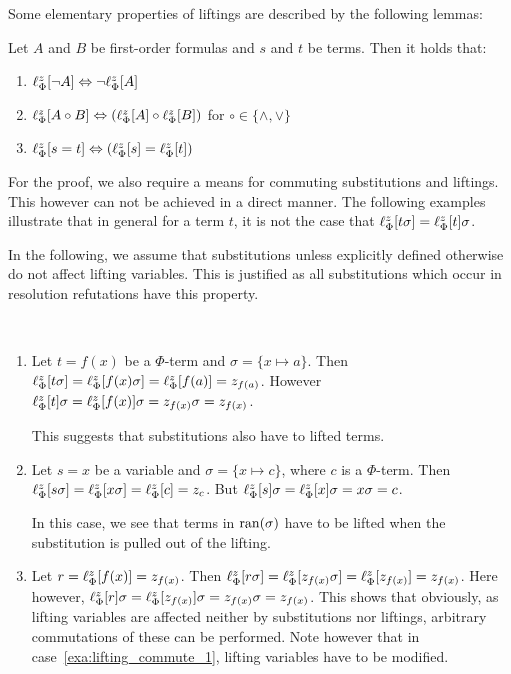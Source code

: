 Some elementary properties of liftings are described by the following lemmas:


\begin{lemma}
	\label{lemma:lift_logic_commute}
	Let $A$ and $B$ be first-order formulas and $s$ and $t$ be terms. Then it holds that:
	\begin{enumerate}
		\item $\lift{\Phi}{\lnot A}{z} \spas\semiff{} \lnot \lift{\Phi}{A}{z}$
		\item $\lift{\Phi}{A \circ B}{z} \spas\semiff{} ( \lift{\Phi}{A}{z} \circ \lift{\Phi}{B}{z} )$ for  $\circ \in \{\land, \lor\}$
		\item $\lift{\Phi}{s = t}{z} \spas\semiff{} ( \lift{\Phi}{s}{z} = \lift{\Phi}{t}{z} )$
	\end{enumerate}
\end{lemma}


For the proof, we also require a means for commuting substitutions and liftings.
This however can not be achieved in a direct manner. The following examples illustrate
that in general for a term $t$, it is not the case that
$
\lifphi{t\sigma} =
\lifphi{t}\sigma 
$.

In the following, we assume that substitutions unless explicitly defined otherwise do not affect lifting variables.
This is justified as all substitutions which occur in resolution refutations have this property.

\begin{exa}
	\label{exa:lifting_commute}
	~
	\begin{enumerate}
		\item
			\label{exa:lifting_commute_1}
			Let $t = f(x)$ be a $\Phi$-term and $\sigma = \{x \mapsto a\}$.
			Then $\lifphi{t\sigma} = \lifphi{f(x)\sigma} = \lifphi{f(a)} = z_{f(a)}$.
			However $\lifphi{t}\sigma = \lifphi{f(x)}\sigma = z_{f(x)}\sigma = z_{f(x)}$.

			This suggests that substitutions also have to lifted terms.

		\item
			\label{exa:lifting_commute_2}
			Let $s=x$ be a variable and $\sigma = \{x\mapsto c\}$, where $c$ is a $\Phi$-term.
			Then $\lifphi{s\sigma} = 
			\lifphi{x\sigma} =
			\lifphi{c} = z_c$.
			But 
			$\lifphi{s}\sigma = 
			\lifphi{x}\sigma = 
			x\sigma = 
			c$.

			In this case, we see that terms in $\ran(\sigma)$ have to be lifted when the substitution is pulled out of the lifting.

		\item
			\label{exa:lifting_commute_3}
			Let $r = \lifphi{f(x)} = z_{f(x)}$.
			Then $\lifphi{r\sigma} = \lifphi{z_{f(x)}\sigma} = \lifphi{z_{f(x)}} = z_{f(x)}$.
			Here however, $\lifphi{r}\sigma = \lifphi{z_{f(x)}}\sigma = z_{f(x)}\sigma = z_{f(x)}$.
			This shows that obviously, as lifting variables are affected neither by substitutions nor liftings, arbitrary commutations of these can be performed. 
			Note however that in case~\ref{exa:lifting_commute_1}, lifting variables have to be modified.
			\qedhere
	\end{enumerate}
\end{exa}

